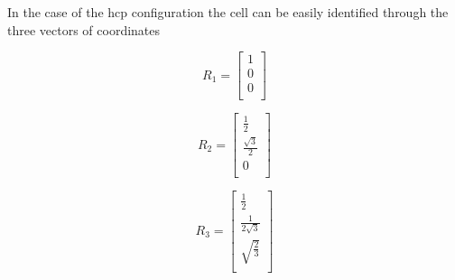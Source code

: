 \documentclass[a4paper]{article}
\begin{document}
    In the case of the hcp configuration the cell can be easily identified through the three vectors of coordinates\\
    \begin{minipage}{0.3\textwidth}
    \centering
    \begin{equation*}
    R_1 =
    \begin{bmatrix}
        1 \\
        0 \\
        0 \\
        
    \end{bmatrix}
    \end{equation*}
    
    \end{minipage}
    \begin{minipage}{0.3\textwidth}
    \centering
    \begin{equation*}
    R_2 =
    \begin{bmatrix}
        \frac{1}{2} \\
        \frac{\sqrt{3}}{2}  \\
        0 \\
    \end{bmatrix}
    \end{equation*}
    \end{minipage}
    \begin{minipage}{0.3\textwidth}
    \centering
    \begin{equation*}
    R_3 =
    \begin{bmatrix}
        \frac{1}{2} \\
        \frac{1}{2\sqrt{3}}  \\
        \sqrt{\frac{2}{3}} \\
    \end{bmatrix}
    \end{equation*}
    \end{minipage}
    
    
    
\end{document}
